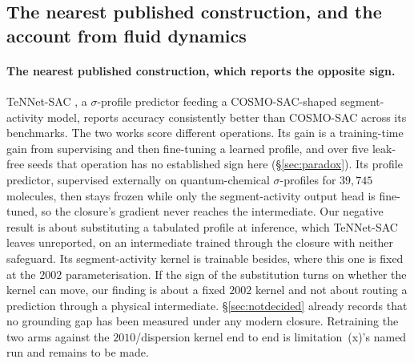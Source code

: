 
\subsection{The nearest published construction, and the account from fluid dynamics}
\label{sec:si-adjacent-constructions}

\paragraph{The nearest published construction, which reports the opposite sign.} TeNNet-SAC
\cite{yang2025tennet}, a $\sigma$-profile predictor feeding a COSMO-SAC-shaped segment-activity
model, reports accuracy consistently better than COSMO-SAC across its benchmarks. The two works score
different operations. Its gain is a training-time gain from supervising and then fine-tuning a
learned profile, and over five leak-free seeds that operation has no established sign here
(\S\ref{sec:paradox}). Its profile predictor, supervised externally on quantum-chemical
$\sigma$-profiles for $39{,}745$ molecules, then stays frozen while only the segment-activity output
head is fine-tuned, so the closure's gradient never reaches the intermediate. Our negative result is
about substituting a tabulated profile at inference, which TeNNet-SAC leaves unreported, on an
intermediate trained through the closure with neither safeguard. Its segment-activity kernel is
trainable besides, where this one is fixed at the $2002$ parameterisation. If the sign of the
substitution turns on whether the kernel can move, our finding is about a fixed $2002$ kernel and
not about routing a prediction through a physical intermediate. \S\ref{sec:notdecided} already
records that no grounding gap has been measured under any modern closure. Retraining the two arms
against the $2010$/dispersion kernel end to end is limitation~(x)'s named run and remains to be made.

